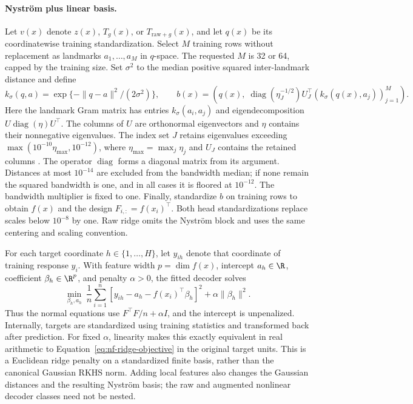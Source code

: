 \paragraph{Nystr\"om plus linear basis.}
\label{sec:nf-head}
Let $v(x)$ denote $z(x)$, $T_g(x)$, or $T_{\mathrm{raw}+g}(x)$, and let
$q(x)$ be its coordinatewise training standardization.  Select $M$ training
rows without replacement as landmarks $a_1,\ldots,a_M$ in $q$-space.
The requested $M$ is 32 or 64, capped by the training size.
Set $\sigma^2$ to the median positive squared inter-landmark distance and
define
\begin{equation}
 k_\sigma(q,a)=\exp\{-\|q-a\|^2/(2\sigma^2)\},\qquad
 b(x)=\left(q(x),\;
       \operatorname{diag}(\eta_J^{-1/2})U_J^\top
                  (k_\sigma(q(x),a_j))_{j=1}^M\right).
 \label{eq:nf-nystrom}
\end{equation}
Here the landmark Gram matrix has entries $k_\sigma(a_i,a_j)$ and
eigendecomposition $U\operatorname{diag}(\eta)U^\top$. The columns
of $U$ are orthonormal eigenvectors and $\eta$ contains their
nonnegative eigenvalues. The index set $J$ retains eigenvalues exceeding
$\max(10^{-10}\eta_{\max},10^{-12})$, where
$\eta_{\max}=\max_j\eta_j$ and $U_J$ contains the retained columns
\citep{Williams2001Nystrom}. The operator $\operatorname{diag}$ forms
a diagonal matrix from its argument.
Distances at most $10^{-14}$ are excluded from the bandwidth median;
if none remain the squared bandwidth is one, and in all cases it is floored
at $10^{-12}$.  The bandwidth multiplier is fixed to one.
Finally, standardize $b$ on training rows to obtain $f(x)$ and the design
$F_{i,:}=f(x_i)^\top$.  Both head standardizations replace scales below
$10^{-8}$ by one.  Raw ridge omits the Nystr\"om block and uses the same
centering and scaling convention.

For each target coordinate $h\in\{1,\ldots,H\}$, let $y_{ih}$
denote that coordinate of training response $y_i$. With feature width
$p=\dim f(x)$, intercept $a_h\in\R$, coefficient
$\beta_h\in\R^p$, and penalty $\alpha>0$, the fitted decoder solves
\begin{equation}
 \min_{\beta_h,a_h}\ \frac1n\sum_{i=1}^n
       [y_{ih}-a_h-f(x_i)^\top\beta_h]^2+\alpha\|\beta_h\|^2.
 \label{eq:nf-ridge-objective}
\end{equation}
Thus the normal equations use $F^\top F/n+\alpha I$, and the intercept is
unpenalized.  Internally, targets are standardized using training statistics
and transformed back after prediction.  For fixed $\alpha$, linearity makes
this exactly equivalent in real arithmetic to
Equation~\eqref{eq:nf-ridge-objective} in the original target units.
This is a Euclidean ridge penalty on a standardized finite basis, rather
than the canonical Gaussian RKHS norm.  Adding local features also changes
the Gaussian distances and the resulting Nystr\"om basis; the raw and
augmented nonlinear decoder classes need not be nested.

